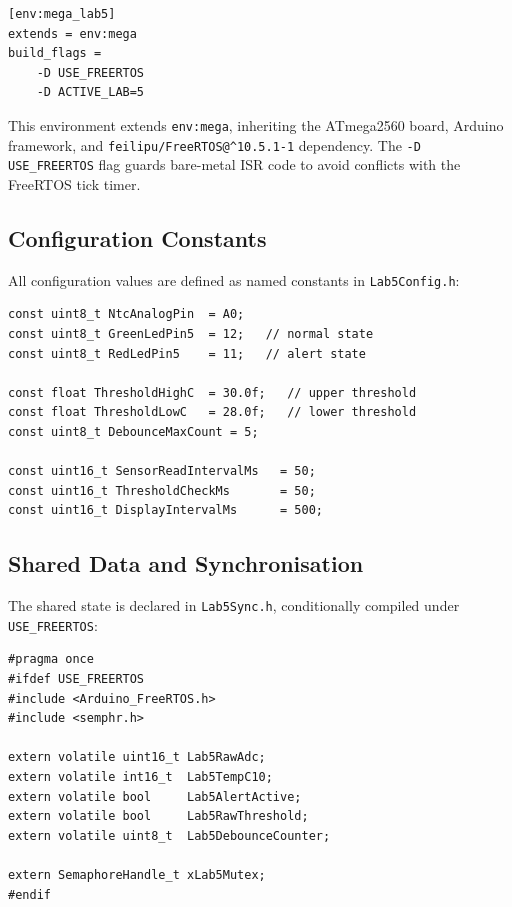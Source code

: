 \documentclass[12pt]{article}
\begin{document}
\begin{lstlisting}
[env:mega_lab5]
extends = env:mega
build_flags =
    -D USE_FREERTOS
    -D ACTIVE_LAB=5
\end{lstlisting}

This environment extends \texttt{env:mega}, inheriting the ATmega2560 board, Arduino framework, and \texttt{feilipu/FreeRTOS@\^{}10.5.1-1} dependency. The \texttt{-D USE\_FREERTOS} flag guards bare-metal ISR code to avoid conflicts with the FreeRTOS tick timer.

\subsection{Configuration Constants}

All configuration values are defined as named constants in \texttt{Lab5Config.h}:

\begin{lstlisting}[caption={Lab5Config.h --- configuration constants}]
const uint8_t NtcAnalogPin  = A0;
const uint8_t GreenLedPin5  = 12;   // normal state
const uint8_t RedLedPin5    = 11;   // alert state

const float ThresholdHighC  = 30.0f;   // upper threshold
const float ThresholdLowC   = 28.0f;   // lower threshold
const uint8_t DebounceMaxCount = 5;

const uint16_t SensorReadIntervalMs   = 50;
const uint16_t ThresholdCheckMs       = 50;
const uint16_t DisplayIntervalMs      = 500;
\end{lstlisting}

\subsection{Shared Data and Synchronisation}

The shared state is declared in \texttt{Lab5Sync.h}, conditionally compiled under \texttt{USE\_FREERTOS}:

\begin{lstlisting}[caption={Lab5Sync.h --- shared volatile data and mutex}]
#pragma once
#ifdef USE_FREERTOS
#include <Arduino_FreeRTOS.h>
#include <semphr.h>

extern volatile uint16_t Lab5RawAdc;
extern volatile int16_t  Lab5TempC10;
extern volatile bool     Lab5AlertActive;
extern volatile bool     Lab5RawThreshold;
extern volatile uint8_t  Lab5DebounceCounter;

extern SemaphoreHandle_t xLab5Mutex;
#endif
\end{lstlisting}
\end{document}
